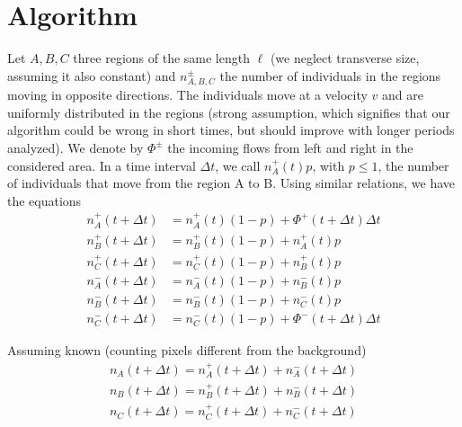 \documentclass{article}
\begin{document}
\section{Algorithm}
Let \(A,B,C\) three regions of the same length \(\ell\) (we neglect transverse size, assuming it also constant) and \(n^{\pm}_{A,B,C}\) the number of individuals in the regions moving in opposite directions. 
The individuals move at a velocity \(v\) and are uniformly distributed in the regions (strong assumption, which signifies that our algorithm could be wrong in short times, but should improve with longer periods analyzed).
We denote by \(\Phi^{\pm}\) the incoming flows from left and right in the considered area. In a time interval \(\Delta t\), we call \(n^+_A(t)p\), with \(p \leq 1\), the number of individuals that move from the region A to B. Using similar relations, we have the equations
\begin{align*}
n^+_A(t + \Delta t) &= n^+_A(t)(1 - p) + \Phi^+(t + \Delta t) \Delta t  \\
n^+_B(t + \Delta t) &= n^+_B(t)(1 - p) + n^+_A(t)p                      \\
n^+_C(t + \Delta t) &= n^+_C(t)(1 - p) + n^+_B(t)p                      \\
n^-_A(t + \Delta t) &= n^-_A(t)(1 - p) + n^-_B(t)p                      \\
n^-_B(t + \Delta t) &= n^-_B(t)(1 - p) + n^-_C(t)p                      \\
n^-_C(t + \Delta t) &= n^-_C(t)(1 - p) + \Phi^-(t + \Delta t) \Delta t
\end{align*}

Assuming known (counting pixels different from the background)
\begin{align*}
n_A(t+\Delta t) = n^+_A(t+\Delta t)+n^-_A(t+\Delta t) \\
n_B(t+\Delta t) = n^+_B(t+\Delta t)+n^-_B(t+\Delta t) \\
n_C(t+\Delta t) = n^+_C(t+\Delta t)+n^-_C(t+\Delta t)
\end{align*}
\end{document}
